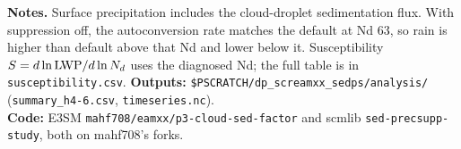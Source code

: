 \documentclass[10pt]{article}
\begin{document}
\noindent\textbf{Notes.} Surface precipitation includes the cloud-droplet sedimentation flux.
With suppression off, the autoconversion rate matches the default at Nd 63, so rain is higher than default above that Nd and lower below it.
Susceptibility $S=d\ln{\rm LWP}/d\ln N_d$ uses the diagnosed Nd; the full table is in \texttt{susceptibility.csv}.
\textbf{Outputs:} \texttt{\$PSCRATCH/dp\_screamxx\_sedps/analysis/} (\texttt{summary\_h4-6.csv}, \texttt{timeseries.nc}).
\\\textbf{Code:} E3SM \texttt{mahf708/eamxx/p3-cloud-sed-factor} and scmlib \texttt{sed-precsupp-study}, both on mahf708's forks.
\end{document}

